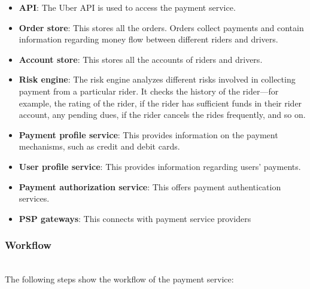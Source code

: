 \begin{itemize}
\item
\protect{}\label{uJh7N0A3wncsK9LVfjddu}
\textbf{API}: The Uber API is used to access the payment service.
\item
\protect{}\label{shtIXlmZPi14HG937vtNe}
\textbf{Order store}: This stores all the orders. Orders collect payments and contain information regarding money flow between different riders and drivers.
\item
\protect{}\label{FiIxBZH5RU0MQj_LPG9HC}
\textbf{Account store}: This stores all the accounts of riders and drivers.
\item
\protect{}\label{tZ4lUxvJNm8x__3cI39PP}
\textbf{Risk engine}: The risk engine analyzes different risks involved in collecting payment from a particular rider. It checks the history of the rider---for example, the rating of the rider, if the rider has sufficient funds in their rider account, any pending dues, if the rider cancels the rides frequently, and so on.
\item
\protect{}\label{TJU1srTVb7Wdlr61Yl7Es}
\textbf{Payment profile service}: This provides information on the payment mechanisms, such as credit and debit cards.
\item
\protect{}\label{OSGq4Ne4d4yWlXpGMWsgE}
\textbf{User profile service}: This provides information regarding users' payments.
\item
\protect{}\label{TIGeWXoGy-qoV2CP0T1si}
\textbf{Payment authorization service}: This offers payment authentication services.
\item
\protect{}\label{mxNmZIVmIcRb05C5P2Fb1}
\textbf{PSP gateways}: This connects with payment service providers
\end{itemize}

\subsubsection{Workflow}\label{5Yrvo3BXtKOqHCM46oMgn}
\\
The following steps show the workflow of the payment service:

